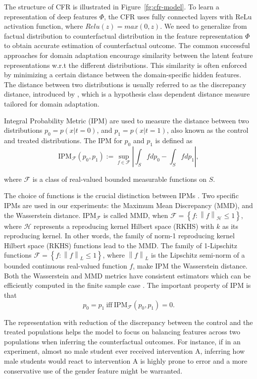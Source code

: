 \documentclass{article}
\begin{document}
The structure of CFR is illustrated in Figure~\ref{fg:cfr-model}. To learn a representation of deep features $\Phi$, the CFR uses fully connected layers with ReLu activation function, where $Relu(z) = max(0, z)$. We need to generalize from factual distribution to counterfactual distribution in the feature representation $\Phi$ to obtain accurate estimation of counterfactual outcome. The common successful approaches for domain adaptation encourage similarity between the latent feature representations w.r.t the different distributions. This similarity is often enforced by minimizing a certain distance between the domain-specific hidden features. The distance between two distributions is usually referred to as the discrepancy distance, introduced by \cite{Mansour2009-fh}, which is a hypothesis class dependent distance measure tailored for domain adaptation. 

Integral Probability Metric (IPM) are used to measure the distance between two distributions $p_0 = p(x|t = 0)$, and $p_1 = p(x|t = 1)$, also known as the control and treated distributions. The IPM for $p_0$ and $p_1$ is defined as
$$\mathrm{IPM}_{\mathcal{F}}(p_0, p_1) := \sup_{f\in \mathcal{F}} \left |\int_S f dp_0 -\int_S f d p_1 \right |,$$

where $\mathcal{F}$ is a class of real-valued bounded measurable functions on $S$. 

The choice of functions is the crucial distinction between IPMs \cite{Sriperumbudur2009-pf}. Two specific IPMs are used in our experiments: the Maximum Mean Discrepancy (MMD), and the Wasserstein distance. $\mathrm{IPM}_{\mathcal{F}}$ is called MMD, when $\mathcal{F} = \left \{ f : \left \| f \right \| _\mathcal{H}\leq 1\right \}$, where $\mathcal{H}$ represents a reproducing kernel Hilbert space (RKHS) with $k$ as its reproducing kernel. In other words, the family of norm-1 reproducing kernel Hilbert space (RKHS) functions lead to the MMD. The family of 1-Lipschitz functions $\mathcal{F} = \left \{ f:\left \| f\right \|_L \leq 1 \right \}$, where $\left \| f\right \|_L$ is the Lipschitz semi-norm of a bounded continuous real-valued function $f$, make IPM the Wasserstein distance. Both the Wasserstein and MMD metrics have consistent estimators which can be efficiently computed in the finite sample case \cite{Sriperumbudur2012-sz}. The important property of IPM is that $$p_0 = p_1~\mathrm{iff}~ \mathrm{IPM}_{\mathcal{F}}(p_0, p_1) = 0.$$

The representation with reduction of the discrepancy between the control and the treated populations helps the model to focus on balancing features across two populations when inferring the counterfactual outcomes. For instance, if in an experiment, almost no male student ever received intervention A, inferring how male students would react to intervention A is highly prone to error and a more conservative use of the gender feature might be warranted.
\end{document}
